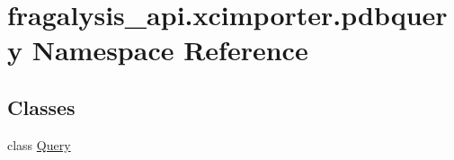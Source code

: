 \hypertarget{namespacefragalysis__api_1_1xcimporter_1_1pdbquery}{}\section{fragalysis\+\_\+api.\+xcimporter.\+pdbquery Namespace Reference}
\label{namespacefragalysis__api_1_1xcimporter_1_1pdbquery}
\subsection*{Classes}
\begin{DoxyCompactItemize}
\item 
class \hyperlink{classfragalysis__api_1_1xcimporter_1_1pdbquery_1_1_query}{Query}
\end{DoxyCompactItemize}
